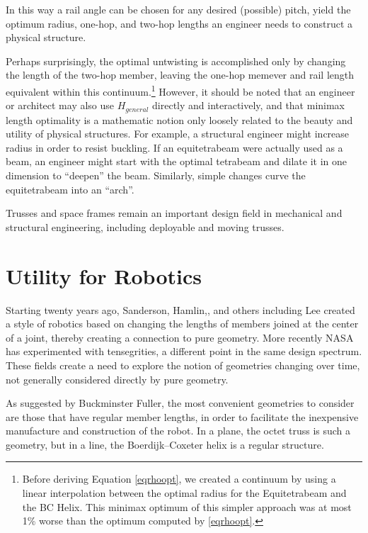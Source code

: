 \documentclass[11pt]{article}
\begin{document}
In this way a rail angle can be chosen for any desired (possible) pitch, yield
the optimum radius, one-hop, and two-hop lengths an engineer needs to
construct a physical structure.

Perhaps surprisingly, the optimal untwisting is accomplished only by
changing the length of the two-hop member, leaving the one-hop memever
and rail length equivalent within this continuum.\footnote{Before deriving Equation \eqref{eqrhoopt}, we created a continuum by
using a linear interpolation between the optimal radius for the
Equitetrabeam and the BC Helix. This minimax optimum of this simpler
approach was at most 1\% worse than the optimum computed by
\eqref{eqrhoopt}.}
 However, it should
be noted that an engineer or architect may also use $H_{general}$
directly and interactively, and that minimax length optimality is a
mathematic notion only loosely related to the beauty and utility of
physical structures. For example, a structural engineer might increase
radius in order to resist buckling. If an equitetrabeam were actually
used as a beam, an engineer might start with the optimal tetrabeam and
dilate it in one dimension to ``deepen'' the beam. Similarly, simple
changes curve the equitetrabeam into an ``arch''.

Trusses and space frames remain an important design field in
mechanical and structural engineering\cite{mikulas1985sequentially},
including deployable and moving trusses\cite{claypool2012readily}.





\section{Utility for Robotics}

Starting twenty years ago, Sanderson\cite{sanderson1996modular},
Hamlin,\cite{TetrobotBook}, and others including
Lee\cite{lee2002dynamic} created a style of robotics based on changing
the lengths of members joined at the center of a joint, thereby
creating a connection to pure geometry. More recently NASA has
experimented with tensegrities\cite{NTRT}, a different point in the
same design spectrum. These fields create a need to explore the notion
of geometries changing over time, not generally considered directly by
pure geometry.

As suggested by Buckminster Fuller, the most convenient geometries to
consider are those that have regular member lengths, in order to
facilitate the inexpensive manufacture and construction of the robot.
In a plane, the octet truss is such a geometry, but in a line, the
Boerdijk--Coxeter helix is a regular structure.
\end{document}
